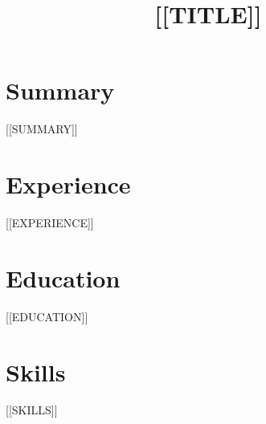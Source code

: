\documentclass[11pt,a4paper,sans]{moderncv}
\title{[[TITLE]]}
\begin{document}
\makecvtitle

\section{Summary}
[[SUMMARY]]

\section{Experience}
[[EXPERIENCE]]

\section{Education}
[[EDUCATION]]

\section{Skills}
[[SKILLS]]
\end{document}

